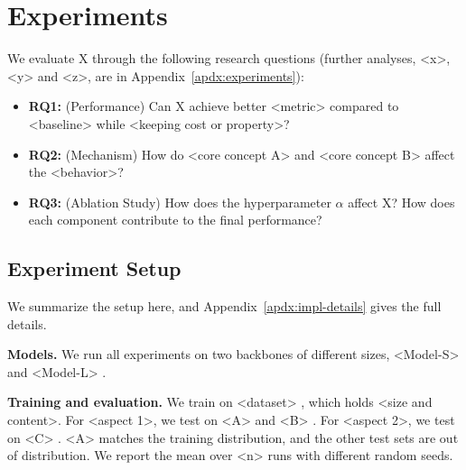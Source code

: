 \section{Experiments} \label{sec:experiments}
We evaluate X through the following research questions (further analyses, \eg <x>, <y> and <z>, are in Appendix~\ref{apdx:experiments}):
\begin{itemize}[leftmargin=*]
    \item \textbf{RQ1:} (Performance) Can X achieve better <metric> compared to <baseline> while <keeping cost or property>?
    \item \textbf{RQ2:} (Mechanism) How do <core concept A> and <core concept B> affect the <behavior>?
    \item \textbf{RQ3:} (Ablation Study) How does the hyperparameter $\alpha$ affect X? How does each component contribute to the final performance?
\end{itemize}

\subsection{Experiment Setup} \label{sec:exp-setup}
We summarize the setup here, and Appendix~\ref{apdx:impl-details} gives the full details.

\textbf{Models.} We run all experiments on two backbones of different sizes, <Model-S> and <Model-L> \citep{Placeholder-A}.

\textbf{Training and evaluation.} We train on <dataset> \citep{Placeholder-B}, which holds <size and content>.
For <aspect 1>, we test on <A> \citep{Placeholder-B} and <B> \citep{Placeholder-C}. For <aspect 2>, we test on <C> \citep{Placeholder-C}.
<A> matches the training distribution, and the other test sets are out of distribution.
We report the mean over <n> runs with different random seeds.

